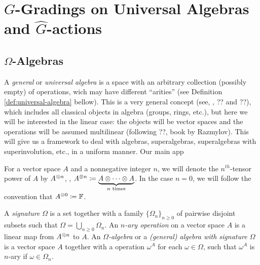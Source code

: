 \chapter{$G$-Gradings on Universal Algebras and $\widehat G$-actions}

 

\section{$\Omega$-Algebras}

A \emph{general} or \emph{universal algebra} is a space with an arbitrary collection (possibly empty) of operations, wich may have different ``arities'' (see Definition \ref{def:universal-algebra} bellow). 
This is a very general concept (see, \eg, ?? and ??), which includes all classical objects in algebra (groups, rings, etc.), but here we will be interested in the linear case: the objects will be vector spaces and the operations will be assumed multilinear (following ??, book by Razmylov).
This will give us a framework to deal with algebras, superalgebras, superalgebras with superinvolution, etc., in a uniform manner.
Our main app

\begin{notation}
    For a vector space $A$ and a nonnegative integer $n$, we will denote the $n^{th}$-tensor power of $A$ by $A^{\otimes n}$, \ie,
    $A^{\otimes n} \coloneqq \underbrace{A\otimes\cdots\otimes A}_{n \text{ times}}$. 
    In the case $n = 0$, we will follow the convention that $A^{\otimes 0} \coloneqq \mathbb{F}$.
\end{notation}

\begin{defi}\label{def:universal-algebra}
    A \emph{signature} $\Omega$ is a set together with a family $\{ \Omega_n \}_{n \geq 0}$ of pairwise disjoint subsets such that $\Omega = \bigcup_{n \geq 0} \Omega_n$. 
    An \emph{$n$-ary operation} on a vector space $A$ is a linear map from $A^{\otimes n}$ to $A$. 
    An \emph{$\Omega$-algebra} or a \emph{(general) algebra with signature $\Omega$} is a vector space $A$ together with a operation $\omega^A$ for each $\omega \in \Omega$, such that $\omega^A$ is $n$-ary if $\omega \in \Omega_n$.
\end{defi}

